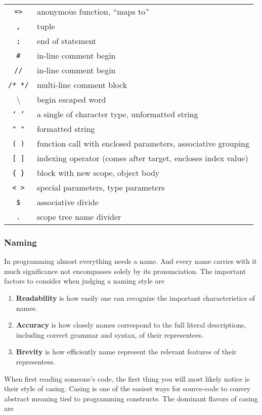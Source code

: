 \documentclass{article}
\newcommand{\code}[1]{\texttt{#1}}
\begin{document}
\begin{tabular}{c|l}
		\code{=>}	&anonymous function, ``maps to'' \\
		\code{,} 		&tuple \\
		\code{;}		&end of statement \\
		\code{\#}		&in-line comment begin \\
		\code{//} 		&in-line comment begin \\
		\code{/* */}   &multi-line comment block \\
		\textbackslash &begin escaped word \\
		\code{` '}	&a single of character type, unformatted string\\
		\code{" "}	&formatted string \\
		\code{( )} 	&function call with enclosed parameters, associative grouping \\
		\code{[ ]}	&indexing operator (comes after target, encloses index value)\\
		\code{\{ \}}	&block with new scope, object body \\
		\code{< >} &special parameters, type parameters \\
		\code{\$}		&associative divide \\
		\code{.}       &scope tree name divider
	\end{tabular}

\subsubsection{Naming}

	In programming almost everything needs a name. And every name carries with it much significance not encompasses solely by its pronunciation. The important factors to consider when judging a naming style are

	\begin{enumerate}
		\item \textbf{Readability} is how easily one can recognize the important characteristics of names.
		\item \textbf{Accuracy} is how closely names correspond to the full literal descriptions, including correct grammar and syntax, of their representees.
		\item \textbf{Brevity} is how efficiently name represent the relevant features of their representees.
	\end{enumerate}

	When first reading someone's code, the first thing you will most likely notice is their style of casing. Casing is one of the easiest ways for source-code to convey abstract meaning tied to programming constructs. The dominant flavors of casing are
\end{document}
